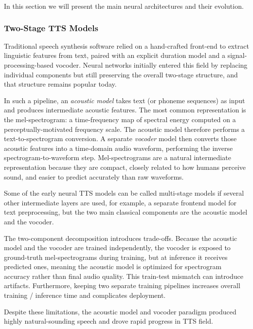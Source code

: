 \documentclass[
         english, %
    monochrome, %
]{VUMIFSEMasterThesis}
\begin{document}
In this section we will present the main neural architectures and their evolution.

\subsubsection{Two-Stage TTS Models}

Traditional speech synthesis software relied on a hand-crafted front-end to extract linguistic features from text, paired with an explicit duration model and a signal-processing-based vocoder.
Neural networks initially entered this field by replacing individual components but still preserving the overall two-stage structure, and that structure remains popular today.

In such a pipeline, an \emph{acoustic model} takes text (or phoneme sequences) as input and produces intermediate acoustic features.
The most common representation is the mel-spectrogram: a time-frequency map of spectral energy computed on a perceptually-motivated frequency scale.
The acoustic model therefore performs a text-to-spectrogram conversion.
A separate \emph{vocoder} model then converts those acoustic features into a time-domain audio waveform, performing the inverse spectrogram-to-waveform step.
Mel-spectrograms are a natural intermediate representation because they are compact, closely related to how humans perceive sound, and easier to predict accurately than raw waveforms.

Some of the early neural TTS models can be called multi-stage models if several other intermediate layers are used, for example, a separate frontend model for text preprocessing, but the two main classical components are the acoustic model and the vocoder.

The two-component decomposition introduces trade-offs.
Because the acoustic model and the vocoder are trained independently, the vocoder is exposed to ground-truth mel-spectrograms during training, but at inference it receives predicted ones, meaning the acoustic model is optimized for spectrogram accuracy rather than final audio quality.
This train-test mismatch can introduce artifacts.
Furthermore, keeping two separate training pipelines increases overall training / inference time and complicates deployment.

Despite these limitations, the acoustic model and vocoder paradigm produced highly natural-sounding speech and drove rapid progress in TTS field.

\end{document}

